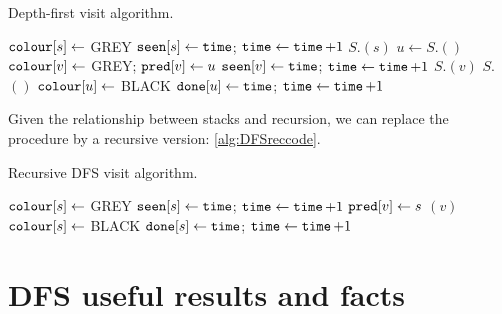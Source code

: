 \begin{algorithm}[H]
  \caption{Depth-first visit algorithm.}
    \label{alg:DFSvisitcode}
\begin{algorithmic}[1]
	\State $\colour[s] \gets $ GREY
	\State $\seen[s] \gets \timeVar$; $\timeVar \gets \timeVar + 1$
	\State $S$.$(s)$
		\State $u \gets S$.$()$
			\State $\colour[v] \gets $ GREY; $\pred[v] \gets u$
			\State $\seen[v] \gets \timeVar$; $\timeVar \gets \timeVar + 1$
			\State $S$.$(v)$
		\Else
			\State $S$.$()$
			\State $\colour[u] \gets $ BLACK
			\State $\done[u] \gets \timeVar$; $\timeVar \gets \timeVar + 1$
		\EndIf
	\EndWhile
\EndFunction
\end{algorithmic}
\end{algorithm}


Given the relationship between stacks and recursion, we can replace the  procedure by
a recursive version: \cref{alg:DFSreccode}.

\begin{algorithm}[H]
  \caption{Recursive DFS visit algorithm.}
    \label{alg:DFSreccode}
\begin{algorithmic}[1]
	\State $\colour[s] \gets $ GREY
	\State $\seen[s] \gets \timeVar$; $\timeVar \gets \timeVar + 1$
			\State $\pred[v] \gets s$
			\State {}$(v)$ 
		\EndIf
	\EndFor
	\State $\colour[s] \gets $ BLACK
	\State $\done[s] \gets \timeVar $; $\timeVar \gets \timeVar + 1$
\EndFunction
\end{algorithmic}
\end{algorithm}

\section{DFS useful results and facts}

